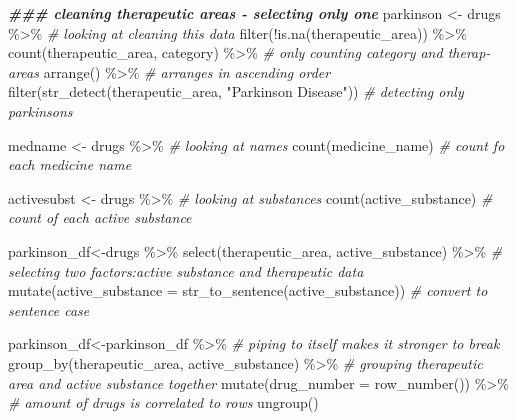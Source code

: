 \documentclass[
]{article}
\newenvironment{Shaded}{\begin{snugshade}}{\end{snugshade}}
\newcommand{\AttributeTok}[1]{\textcolor[rgb]{0.77,0.63,0.00}{#1}}
\newcommand{\CommentTok}[1]{\textcolor[rgb]{0.56,0.35,0.01}{\textit{#1}}}
\newcommand{\DocumentationTok}[1]{\textcolor[rgb]{0.56,0.35,0.01}{\textbf{\textit{#1}}}}
\newcommand{\FunctionTok}[1]{\textcolor[rgb]{0.00,0.00,0.00}{#1}}
\newcommand{\NormalTok}[1]{#1}
\newcommand{\OtherTok}[1]{\textcolor[rgb]{0.56,0.35,0.01}{#1}}
\newcommand{\SpecialCharTok}[1]{\textcolor[rgb]{0.00,0.00,0.00}{#1}}
\newcommand{\StringTok}[1]{\textcolor[rgb]{0.31,0.60,0.02}{#1}}
\begin{document}
\begin{Shaded}
\begin{Highlighting}[]
\DocumentationTok{\#\#\# cleaning therapeutic areas {-} selecting only one}
\NormalTok{ parkinson }\OtherTok{\textless{}{-}}\NormalTok{ drugs }\SpecialCharTok{\%\textgreater{}\%} \CommentTok{\# looking at cleaning this data}
 \FunctionTok{filter}\NormalTok{(}\SpecialCharTok{!}\FunctionTok{is.na}\NormalTok{(therapeutic\_area)) }\SpecialCharTok{\%\textgreater{}\%}
  \FunctionTok{count}\NormalTok{(therapeutic\_area, category) }\SpecialCharTok{\%\textgreater{}\%} \CommentTok{\# only counting category and therap{-}areas }
  \FunctionTok{arrange}\NormalTok{() }\SpecialCharTok{\%\textgreater{}\%} \CommentTok{\# arranges in ascending order}
  \FunctionTok{filter}\NormalTok{(}\FunctionTok{str\_detect}\NormalTok{(therapeutic\_area, }\StringTok{"Parkinson Disease"}\NormalTok{)) }\CommentTok{\#  detecting only parkinsons}
 
\NormalTok{ medname }\OtherTok{\textless{}{-}}\NormalTok{ drugs }\SpecialCharTok{\%\textgreater{}\%}  \CommentTok{\# looking at names}
  \FunctionTok{count}\NormalTok{(medicine\_name) }\CommentTok{\# count fo each medicine name}
   
\NormalTok{ activesubst }\OtherTok{\textless{}{-}}\NormalTok{ drugs }\SpecialCharTok{\%\textgreater{}\%} \CommentTok{\# looking at substances}
  \FunctionTok{count}\NormalTok{(active\_substance) }\CommentTok{\# count of each active substance}
 
\NormalTok{parkinson\_df}\OtherTok{\textless{}{-}}\NormalTok{drugs }\SpecialCharTok{\%\textgreater{}\%} 
  \FunctionTok{select}\NormalTok{(therapeutic\_area, active\_substance) }\SpecialCharTok{\%\textgreater{}\%} \CommentTok{\# selecting two factors:active substance and therapeutic data}
  \FunctionTok{mutate}\NormalTok{(}\AttributeTok{active\_substance =} \FunctionTok{str\_to\_sentence}\NormalTok{(active\_substance)) }\CommentTok{\# convert to sentence case}

\NormalTok{parkinson\_df}\OtherTok{\textless{}{-}}\NormalTok{parkinson\_df }\SpecialCharTok{\%\textgreater{}\%}  \CommentTok{\# piping to itself makes it stronger to break}
  \FunctionTok{group\_by}\NormalTok{(therapeutic\_area, active\_substance) }\SpecialCharTok{\%\textgreater{}\%} \CommentTok{\# grouping therapeutic area and active substance together}
  \FunctionTok{mutate}\NormalTok{(}\AttributeTok{drug\_number =} \FunctionTok{row\_number}\NormalTok{()) }\SpecialCharTok{\%\textgreater{}\%} \CommentTok{\# amount of drugs is correlated to rows}
  \FunctionTok{ungroup}\NormalTok{() }
 

\end{Highlighting}
\end{Shaded}
\end{document}
